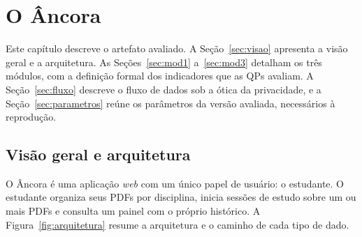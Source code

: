 \documentclass[portuguese,oneside]{tcc}
\newcommand{\ferramenta}{Âncora\xspace}
\newcommand{\estr}[1]{\emph{#1}}
\begin{document}
\chapter{\label{chap:ferramenta}O \ferramenta}

Este capítulo descreve o artefato avaliado. A Seção~\ref{sec:visao} apresenta a visão geral e a arquitetura. As Seções~\ref{sec:mod1} a~\ref{sec:mod3} detalham os três módulos, com a definição formal dos indicadores que as QPs avaliam. A Seção~\ref{sec:fluxo} descreve o fluxo de dados sob a ótica da privacidade, e a Seção~\ref{sec:parametros} reúne os parâmetros da versão avaliada, necessários à reprodução.

\section{\label{sec:visao}Visão geral e arquitetura}

O \ferramenta é uma aplicação \estr{web} com um único papel de usuário: o estudante. O estudante organiza seus PDFs por disciplina, inicia sessões de estudo sobre um ou mais PDFs e consulta um painel com o próprio histórico. A Figura~\ref{fig:arquitetura} resume a arquitetura e o caminho de cada tipo de dado.
\end{document}
